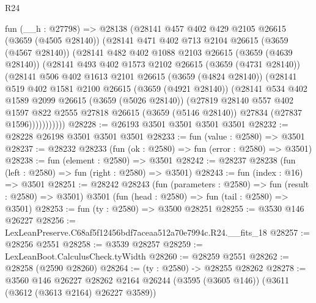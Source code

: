 \begin{lexlean}{R24}
\begin{coremodule}
      fun (__h : @27798) =>
      @28138
        (@28141
          @457
          @402
          @429
          @2105
          @26615
          (@3659 (@4505 @28140))
          (@28141
            @471
            @402
            @713
            @2104
            @26615
            (@3659 (@4567 @28140))
            (@28141
              @482
              @402
              @1088
              @2103
              @26615
              (@3659 (@4639 @28140))
              (@28141
                @493
                @402
                @1573
                @2102
                @26615
                (@3659 (@4731 @28140))
                (@28141
                  @506
                  @402
                  @1613
                  @2101
                  @26615
                  (@3659 (@4824 @28140))
                  (@28141
                    @519
                    @402
                    @1581
                    @2100
                    @26615
                    (@3659 (@4921 @28140))
                    (@28141
                      @534
                      @402
                      @1589
                      @2099
                      @26615
                      (@3659 (@5026 @28140))
                      (@27819
                        @28140
                        @557
                        @402
                        @1597
                        @822
                        @2555
                        @27818
                        @26615
                        (@3659 (@5146 @28140))
                        @27834
                        (@27837 @1596)))))))))))
@28228 := @26193 @3501 @3501 @3501 @3501
@28232 := @28228 @26198 @3501 @3501 @3501
@28233 := fun (value : @2580) => @3501
@28237 := @28232 @28233 (fun (ok : @2580) => fun (error : @2580) => @3501)
@28238 := fun (element : @2580) => @3501
@28242 := @28237 @28238 (fun (left : @2580) => fun (right : @2580) => @3501)
@28243 := fun (index : @16) => @3501
@28251 := @28242
    @28243
    (fun (parameters : @2580) => fun (result : @2580) => @3501)
    @3501
    (fun (head : @2580) => fun (tail : @2580) => @3501)
@28253 := fun (ty : @2580) => @3500 @28251
@28255 := @3530 @146 @26227
@28256 := LexLeanPreserve.C68af5f12456bdf7aceaa512a70e7994c.R24.__fits_18
@28257 := @28256 @2551
@28258 := @3539 @28257
@28259 := LexLeanBoot.CalculusCheck.tyWidth
@28260 := @28259 @2551
@28262 := @28258 (@2590 @28260)
@28264 := (ty : @2580) -> @28255 @28262
@28278 := @3560
    @146
    @26227
    @28262
    @2164
    @26244
    (@3595 (@3605 @146))
    (@3611 (@3612 (@3613 @2164) @26227 @3589))

\end{coremodule}
\end{lexlean}
